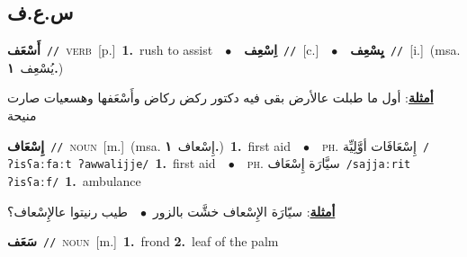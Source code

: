 \documentclass[10pt,a4paper,twoside]{article} %
\begin{document}
\begin{multicols}{2}
\vspace{-3mm}
\subsection*{\color{blue}\foreignlanguage{arabic}{س.ع.ف}\color{blue}{}} 

{\setlength\topsep{0pt}\textbf{\foreignlanguage{arabic}{أَسْعَف}}\ {\color{gray}\texttt{//}\color{black}}\ \textsc{verb}\ [p.]\ \textbf{1.}~rush to assist\ \ $\bullet$\ \ \setlength\topsep{0pt}\textbf{\foreignlanguage{arabic}{اِسْعِف}}\ {\color{gray}\texttt{//}\color{black}}\ [c.]\ \ $\bullet$\ \ \setlength\topsep{0pt}\textbf{\foreignlanguage{arabic}{يِسْعِف}}\ {\color{gray}\texttt{//}\color{black}}\ [i.]\ \color{gray}(msa. \foreignlanguage{arabic}{يُسْعِف}~\foreignlanguage{arabic}{\textbf{١.}})\color{black}\  \begin{flushright}\color{gray}\foreignlanguage{arabic}{\textbf{\underline{\foreignlanguage{arabic}{أمثلة}}}: أول ما طبلت عالأرض بقى فيه دكتور ركض ركاض وأَسْعَفها وهسعيات صارت منيحة}\end{flushright}\color{black}} \vspace{2mm}

{\setlength\topsep{0pt}\textbf{\foreignlanguage{arabic}{إِسْعَاف}}\ {\color{gray}\texttt{//}\color{black}}\ \textsc{noun}\ [m.]\ \color{gray}(msa. \foreignlanguage{arabic}{إِسْعاف}~\foreignlanguage{arabic}{\textbf{١.}})\color{black}\ \textbf{1.}~first aid\ \ $\bullet$\ \ \textsc{ph.} \color{gray} \foreignlanguage{arabic}{إِسْعَافَات أوَّلِيِّة}\color{black}\ {\color{gray}\texttt{/{\sffamily ʔisʕaːfaːt ʔawwalijje}/}\color{black}}\ \textbf{1.}~first aid\ \ $\bullet$\ \ \textsc{ph.} \color{gray} \foreignlanguage{arabic}{سيَّارَة إِسْعَاف}\color{black}\ {\color{gray}\texttt{/{\sffamily sajjaːrit ʔisʕaːf}/}\color{black}}\ \textbf{1.}~ambulance\  \begin{flushright}\color{gray}\foreignlanguage{arabic}{\textbf{\underline{\foreignlanguage{arabic}{أمثلة}}}: سيّارَة الإِسْعاف خشَّت بالزور\ $\bullet$\ \  طيب رنيتوا عالإِسْعاف؟}\end{flushright}\color{black}} \vspace{2mm}

{\setlength\topsep{0pt}\textbf{\foreignlanguage{arabic}{سَعَف}}\ {\color{gray}\texttt{//}\color{black}}\ \textsc{noun}\ [m.]\ \textbf{1.}~frond  \textbf{2.}~leaf of the palm\ } \vspace{2mm}


\end{multicols}
\end{document}
